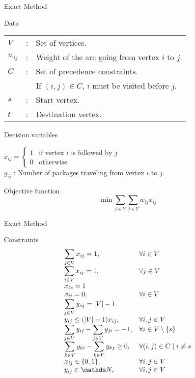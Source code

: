 \documentclass{beamer}
\begin{document}
\begin{frame}{Exact Method}
	\begin{block}{Data}
		\begin{tabular}{lll}
			$V$ & : & Set of vertices.\\ 
			$w_{ij}$ & : & Weight of the arc going from vertex $i$ to $j$.\\
			$C$ & : & Set of precedence constraints.\\
			& & If $(i,j) \in C$, $i$ must be visited before $j$.\\
			$s$ & : & Start vertex.\\
			$t$ & : & Destination vertex.
		\end{tabular}
	\end{block}

	\begin{block}{Decision variables}
	
		$x_{ij} = \begin{cases}
			1 & \text{if vertex } i \text{ is followed by } j\\
			0 & \text{otherwise}
		\end{cases}$\\
	
		$y_{ij}$ : Number of packages traveling from vertex $i$ to $j$.
	\end{block}

	\begin{block}{Objective function}
		$$\min \sum_{i \in V}\sum_{j \in V} w_{ij} x_{ij}$$
	\end{block}
\end{frame}

\begin{frame}{Exact Method}
	\begin{block}{Constraints}
		$$\begin{array}{ll}
			\displaystyle\sum_{j \in V} x_{ij} = 1, & \forall i \in V\\
			\displaystyle\sum_{i \in V} x_{ij} = 1, & \forall j \in V\\
			x_{ts} = 1 &\\
			x_{ii} = 0, & \forall i \in V\\
			\displaystyle\sum_{j \in V} y_{sj} = |V| - 1&\\
			y_{ij} \le (|V| - 1) x_{ij}, & \forall i, j \in V\\
			\displaystyle\sum_{j \in V} y_{ij} - \displaystyle\sum_{j \in V} y_{ji} = -1, & \forall i \in V\setminus\{s\}\\
			\displaystyle\sum_{k \in V} y_{ki} - \displaystyle\sum_{k \in V} y_{kj} \ge 0, & \forall (i,j) \in C \mid i \ne s\\
			x_{ij} \in \{0, 1\}, & \forall i,j \in V\\
			y_{ij} \in \N, & \forall i,j \in V\\
		\end{array}$$
	\end{block}
\end{frame}
\end{document}
